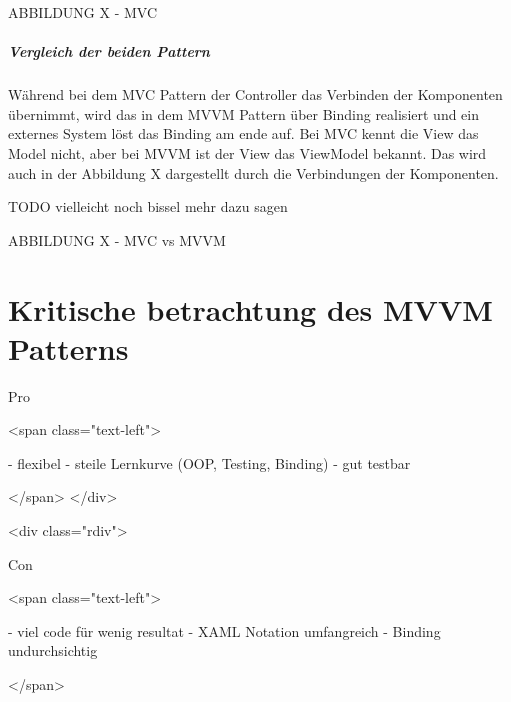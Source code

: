 \documentclass[titlepage=false,12pt]{scrreprt}
\begin{document}
ABBILDUNG X - MVC

\paragraph{Vergleich der beiden Pattern}

Während bei dem MVC Pattern der Controller das Verbinden der Komponenten übernimmt, wird das
in dem MVVM Pattern über Binding realisiert und ein externes System löst das Binding am ende auf.
Bei MVC kennt die View das Model nicht, aber bei MVVM ist der View das ViewModel bekannt.
Das wird auch in der Abbildung X dargestellt durch die Verbindungen der Komponenten.

TODO vielleicht noch bissel mehr dazu sagen

ABBILDUNG X - MVC vs MVVM

\chapter{Kritische betrachtung des MVVM Patterns}



Pro

<span class="text-left">

- flexibel
- steile Lernkurve (OOP, Testing, Binding)
- gut testbar

</span>
</div>

<div class="rdiv">

Con

<span class="text-left">

- viel code für wenig resultat
- XAML Notation umfangreich
- Binding undurchsichtig

</span>
\end{document}
